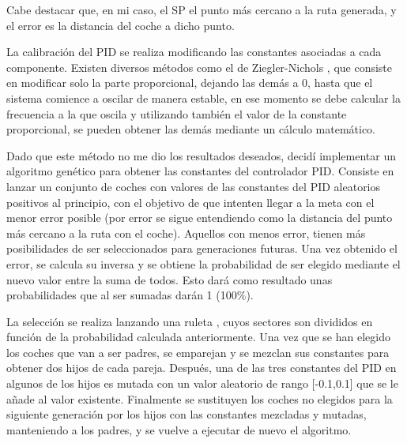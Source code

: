 \bigskip

Cabe destacar que, en mi caso, el SP el punto más cercano a la ruta generada, y el error es la distancia del coche a dicho punto.

\bigskip

La calibración del PID se realiza modificando las constantes asociadas a cada componente. Existen diversos métodos como el de Ziegler-Nichols \cite{enwiki:1140258750}, que consiste en modificar solo la parte proporcional, dejando las demás a 0, hasta que el sistema comience a oscilar de manera estable, en ese momento se debe calcular la frecuencia a la que oscila y utilizando también el valor de la constante proporcional, se pueden obtener las demás mediante un cálculo matemático.

\bigskip

Dado que este método no me dio los resultados deseados, decidí implementar un algoritmo genético para obtener las constantes del controlador PID. Consiste en lanzar un conjunto de coches con valores de las constantes del PID aleatorios positivos al principio, con el objetivo de que intenten llegar a la meta con el menor error posible (por error se sigue entendiendo como la distancia del punto más cercano a la ruta con el coche). Aquellos con menos error, tienen más posibilidades de ser seleccionados para generaciones futuras. Una vez obtenido el error, se calcula su inversa y se obtiene la probabilidad de ser elegido mediante el nuevo valor entre la suma de todos. Esto dará como resultado unas probabilidades que al ser sumadas darán 1 (100\%). 

\bigskip

La selección se realiza lanzando una ruleta \cite{enwiki:1141636554}, cuyos sectores son divididos en función de la probabilidad calculada anteriormente.
Una vez que se han elegido los coches que van a ser padres, se emparejan y se mezclan sus constantes para obtener dos hijos de cada pareja. Después, una de las tres constantes del PID en algunos de los hijos es mutada con un valor aleatorio de rango [-0.1,0.1] que se le añade al valor existente. Finalmente se sustituyen los coches no elegidos para la siguiente generación por los hijos con las constantes mezcladas y mutadas, manteniendo a los padres, y se vuelve a ejecutar de nuevo el algoritmo.

\bigskip


